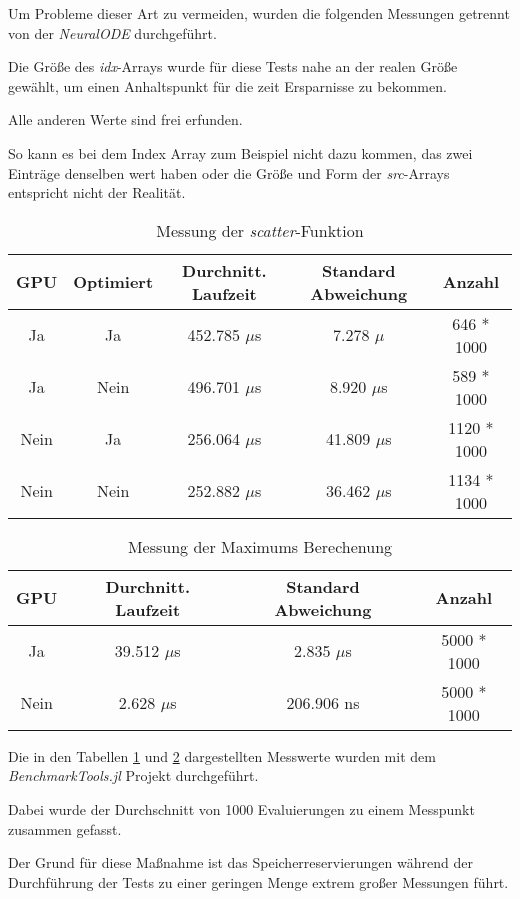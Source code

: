 Um Probleme dieser Art zu vermeiden, wurden die folgenden Messungen getrennt von der \textit{NeuralODE} durchgeführt.

Die Größe des \textit{idx}-Arrays wurde für diese Tests nahe an der realen Größe gewählt, um einen Anhaltspunkt für die zeit Ersparnisse zu bekommen.

Alle anderen Werte sind frei erfunden.

So kann es bei dem Index Array zum Beispiel nicht dazu kommen, 
das zwei Einträge denselben wert haben oder die Größe und Form der \textit{src}-Arrays entspricht nicht der Realität.

\begin{table}[h!]
\centering
\begin{tabular}{c|c|c|c|c} 
     GPU & Optimiert & Durchnitt. Laufzeit & Standard Abweichung & Anzahl \\
     \hline
     Ja & Ja     & 452.785 $\mu$s  & 7.278  $\mu$   & 646 * 1000\\
     Ja & Nein   & 496.701 $\mu$s  & 8.920  $\mu$s  &  589 * 1000\\
     Nein & Ja   & 256.064 $\mu$s  & 41.809 $\mu$s  & 1120 * 1000\\
     Nein & Nein & 252.882 $\mu$s  & 36.462 $\mu$s  & 1134 * 1000\\
\end{tabular}
\caption{Messung der \textit{scatter}-Funktion}
\label{table:Scatter}
\end{table}

\begin{table}[h!] 
\centering
\begin{tabular}{c|c|c|c}
     GPU & Durchnitt. Laufzeit & Standard Abweichung & Anzahl \\
     \hline
     Ja     & 39.512 $\mu$s  & 2.835 $\mu$s & 5000 * 1000 \\
     Nein   & 2.628  $\mu$s  &  206.906 ns & 5000 * 1000 \\
\end{tabular}
\caption{Messung der Maximums Berechenung}
\label{table:Maximum}
\end{table}

Die in den Tabellen \ref{table:Scatter} und \ref{table:Maximum} dargestellten Messwerte wurden mit dem \textit{BenchmarkTools.jl} Projekt durchgeführt.

Dabei wurde der Durchschnitt von 1000 Evaluierungen zu einem Messpunkt zusammen gefasst.

Der Grund für diese Maßnahme ist das Speicherreservierungen während der Durchführung der Tests zu einer geringen Menge extrem großer 
Messungen führt.

